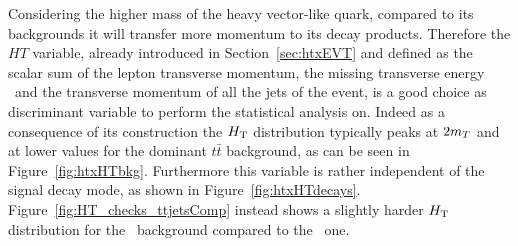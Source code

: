 Considering the higher mass of the heavy vector-like quark, compared to its
backgrounds it will transfer more momentum to its decay products.
Therefore the $HT$ variable, already introduced in Section~\ref{sec:htxEVT} and
defined as the scalar sum of the lepton transverse momentum, the missing transverse
energy \met\ and the transverse momentum of all the jets of the event,
is a good choice as discriminant variable to perform the statistical 
analysis on. Indeed as a consequence of its construction the $\HT$ distribution 
typically peaks at $2 m_{\T}$ and at lower values for the dominant 
$t\bar{t}$ background, as can be seen in Figure~\ref{fig:htxHTbkg}.
Furthermore this variable is rather independent of the signal decay 
mode, as shown in Figure~\ref{fig:htxHTdecays}.
Figure~\ref{fig:HT_checks_ttjetsComp} instead shows a slightly harder
$\HT$ distribution for the \tthf\ background compared to the
\ttlf\ one.


